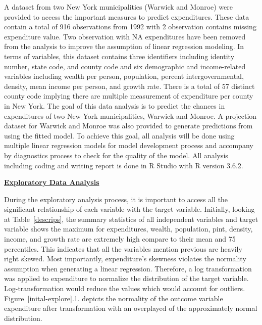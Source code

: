 \documentclass[11pt]{article}\usepackage[]{graphicx}\usepackage[]{color}
\begin{document}
\noindent A dataset from two New York municipalities (Warwick and Monroe) were provided to access the important measures to predict expenditures. These data contain a total of 916 observations from 1992 with 2 observation contains missing expenditure value. Two observation with NA expenditures have been removed from the analysis to improve the assumption of linear regression modeling. In terms of variables, this dataset contains three identifiers including identity number, state code, and county code and six demographic and income-related variables including wealth per person, population, percent intergovernmental, density, mean income per person, and growth rate. There is a total of 57 distinct county code implying there are multiple measurement of expenditure per county in New York. The goal of this data analysis is to predict the chances in expenditures of two New York municipalities, Warwick and Monroe. A projection dataset for Warwick and Monroe was also provided to generate predictions from using the fitted model. To achieve this goal, all analysis will be done using multiple linear regression models for model development process and accompany by diagnostics process to check for the quality of the model. All analysis including coding and writing report is done in R Studio with R version 3.6.2.    
\hfill \break

\noindent\textbf{\underline{Exploratory Data Analysis}} 

\noindent During the exploratory analysis process, it is important to access all the significant relationship of each variable with the target variable. Initially, looking at Table~\ref{descrips}, the summary statistics of all independent variables and target variable shows the maximum for expenditures, wealth, population, pint, density, income, and growth rate are extremely high compare to their mean and 75 percentiles. This indicates that all the variables mention previous are heavily right skewed. Most importantly, expenditure's skewness violates the normality assumption when generating a linear regression. Therefore, a log transformation was applied to expenditure to normalize the distribution of the target variable. Log-transformation would reduce the values which would account for outliers. Figure~\ref{inital-explore}.1. depicts the normality of the outcome variable expenditure after transformation with an overplayed of the approximately normal distribution.
\end{document}
